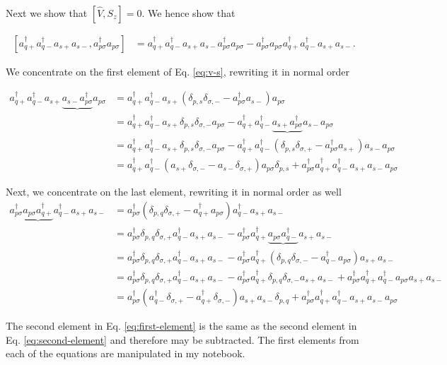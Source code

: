 \documentclass[aps,prl,groupedaddress]{revtex4-1}  %
\begin{document}
Next we show that $ [\hat{V},S_z] =0$. We hence show that

\begin{align}\label{eq:v-s}
[a^\dagger_{q+}a^\dagger_{q-}a_{s+}a_{s-}, a^\dagger_{p\sigma}a_{p\sigma}] &=
a^\dagger_{q+}a^\dagger_{q-}a_{s+}a_{s-}a^\dagger_{p\sigma}a_{p\sigma}
-a^\dagger_{p\sigma}a_{p\sigma}a^\dagger_{q+}a^\dagger_{q-}a_{s+}a_{s-}.
\end{align}


We concentrate on the first element of Eq. \ref{eq:v-s}, rewriting it in normal order

\begin{align}\label{eq:first-element}
a^\dagger_{q+} a^\dagger_{q-} a_{s+} \underbrace{a_{s-} a^\dagger_{p\sigma}} a_{p\sigma} &=
a^\dagger_{q+} a^\dagger_{q-} a_{s+} (\delta_{p,s}\delta_{\sigma,-} - a^\dagger_{p\sigma}a_{s-}) a_{p\sigma} \nonumber\\
&= a^\dagger_{q+} a^\dagger_{q-} a_{s+} \delta_{p,s}\delta_{\sigma,-} a_{p\sigma} 
-a^\dagger_{q+} a^\dagger_{q-} \underbrace{a_{s+} a^\dagger_{p\sigma}} a_{s-} a_{p\sigma} \nonumber\\
&= a^\dagger_{q+} a^\dagger_{q-} a_{s+} \delta_{p,s}\delta_{\sigma,-} a_{p\sigma} 
-a^\dagger_{q+} a^\dagger_{q-} (\delta_{p,s} \delta_{\sigma,+} - a^\dagger_{p\sigma}a_{s+}) a_{s-} a_{p\sigma} \nonumber\\
&= a^\dagger_{q+} a^\dagger_{q-} ( a_{s+} \delta_{\sigma,-}
- a_{s-}  \delta_{\sigma,+} ) a_{p\sigma} \delta_{p,s}
+a^\dagger_{p\sigma} a^\dagger_{q+} a^\dagger_{q-} a_{s+} a_{s-} a_{p\sigma} 
\end{align}

Next, we concentrate on the last element, rewriting it in normal order as well
\begin{align}\label{eq:second-element}
a^\dagger_{p\sigma} \underbrace{a_{p\sigma}a^\dagger_{q+}} a^\dagger_{q-} a_{s+} a_{s-} &= 
a^\dagger_{p\sigma} (\delta_{p,q}\delta_{\sigma,+} - a^\dagger_{q+}a_{p\sigma} ) a^\dagger_{q-} a_{s+} a_{s-} \nonumber\\
&= a^\dagger_{p\sigma} \delta_{p,q}\delta_{\sigma,+} a^\dagger_{q-} a_{s+} a_{s-}
-a^\dagger_{p\sigma} a^\dagger_{q+} \underbrace{a_{p\sigma} a^\dagger_{q-} }a_{s+} a_{s-} \nonumber\\
&= a^\dagger_{p\sigma} \delta_{p,q}\delta_{\sigma,+} a^\dagger_{q-} a_{s+} a_{s-}
-a^\dagger_{p\sigma} a^\dagger_{q+} ( \delta_{p,q}\delta_{\sigma,-} - a^\dagger_{q-} a_{p\sigma}) a_{s+} a_{s-} \nonumber\\
&= a^\dagger_{p\sigma} \delta_{p,q}\delta_{\sigma,+} a^\dagger_{q-} a_{s+} a_{s-}
-a^\dagger_{p\sigma} a^\dagger_{q+} \delta_{p,q}\delta_{\sigma,-} a_{s+} a_{s-}
+a^\dagger_{p\sigma} a^\dagger_{q+}a^\dagger_{q-} a_{p\sigma} a_{s+} a_{s-} \nonumber\\
&= a^\dagger_{p\sigma} ( a^\dagger_{q-} \delta_{\sigma,+}
- a^\dagger_{q+} \delta_{\sigma,-})a_{s+} a_{s-}\delta_{p,q}
+a^\dagger_{p\sigma} a^\dagger_{q+} a^\dagger_{q-} a_{s+} a_{s-} a_{p\sigma}
\end{align}

The second element in Eq. \ref{eq:first-element} is the same as the second element in Eq. \ref{eq:second-element} and therefore may be subtracted. The first elements from each of the equations are manipulated in my notebook.



\end{document}
